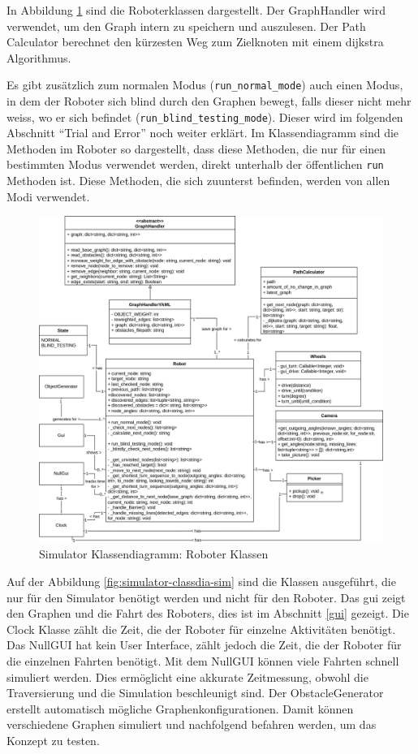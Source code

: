 In Abbildung \ref{fig:simulator-classdia-robot} sind die Roboterklassen dargestellt. Der GraphHandler wird verwendet, um den Graph intern zu speichern und auszulesen. Der Path Calculator berechnet den kürzesten Weg zum Zielknoten mit einem \gls{dijkstra} Algorithmus.

Es gibt zusätzlich zum normalen Modus (\verb|run_normal_mode|) auch einen Modus, in dem der Roboter sich blind durch den Graphen bewegt, falls dieser nicht mehr weiss, wo er sich befindet (\verb|run_blind_testing_mode|). Dieser wird im folgenden Abschnitt ``Trial and Error'' noch weiter erklärt. Im Klassendiagramm sind die Methoden im Roboter so dargestellt, dass diese Methoden, die nur für einen bestimmten Modus verwendet werden, direkt unterhalb der öffentlichen \verb|run| Methoden ist. Diese Methoden, die sich zuunterst befinden, werden von allen Modi verwendet. 

\begin{figure}[H]
\centering
\includegraphics[width=\textwidth]{assets/informatik-prototyp/simulator/simulator-robot-erd.png}
\caption{Simulator Klassendiagramm: Roboter Klassen}
\label{fig:simulator-classdia-robot}
\end{figure}

Auf der Abbildung \ref{fig:simulator-classdia-sim} sind die Klassen ausgeführt, die nur für den Simulator benötigt werden und nicht für den Roboter. Das \acrshort{gui} zeigt den Graphen und die Fahrt des Roboters, dies ist im Abschnitt \ref{gui} gezeigt. Die Clock Klasse zählt die Zeit, die der Roboter für einzelne Aktivitäten benötigt. Das NullGUI hat kein User Interface, zählt jedoch die Zeit, die der Roboter für die einzelnen Fahrten benötigt. Mit dem NullGUI können viele Fahrten schnell simuliert werden. Dies ermöglicht eine akkurate Zeitmessung, obwohl die Traversierung und die Simulation beschleunigt sind. Der ObstacleGenerator erstellt automatisch mögliche Graphenkonfigurationen. Damit können verschiedene Graphen simuliert und nachfolgend befahren werden, um das Konzept zu testen.

